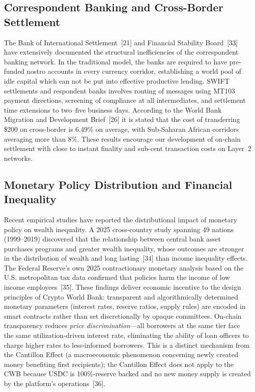 \documentclass[12pt,a4paper]{report}
\begin{document}
\subsection{Correspondent Banking and Cross-Border Settlement}

The Bank of International Settlement~[21] and Financial Stability Board~[33] have extensively documented the structural inefficiencies of the correspondent banking network. In the traditional model, the banks are required to have pre-funded nostro accounts in every currency corridor, establishing a world pool of idle capital which can not be put into effective productive lending. SWIFT settlements and respondent banks involves routing of messages using MT103 payment directions, screening of compliance at all intermediates, and settlement time extensions to two--five business days. According to the World Bank Migration and Development Brief~[26] it is stated that the cost of transferring \$200 on cross-border is 6.49\% on average, with Sub-Saharan African corridors averaging more than 8\%. These results encourage our development of on-chain settlement with close to instant finality and sub-cent transaction costs on Layer~2 networks.

\subsection{Monetary Policy Distribution and Financial Inequality}

Recent empirical studies have reported the distributional impact of monetary policy on wealth inequality. A 2025 cross-country study spanning 49 nations (1999--2019) discovered that the relationship between central bank asset purchases programs and greater wealth inequality, whose outcomes are stronger in the distribution of wealth and long lasting~[34] than income inequality effects. The Federal Reserve's own 2025 contractionary monetary analysis based on the U.S. metropolitan tax data confirmed that policies harm the income of low income employees~[35]. These findings deliver economic incentive to the design principles of Crypto World Bank: transparent and algorithmically determined monetary parameters (interest rates, reserve ratios, supply rules) are encoded in smart contracts rather than set discretionally by opaque committees. On-chain transparency reduces \textit{price discrimination}---all borrowers at the same tier face the same utilization-driven interest rate, eliminating the ability of loan officers to charge higher rates to less-informed borrowers. This is a distinct mechanism from the Cantillon Effect (a macroeconomic phenomenon concerning newly created money benefiting first recipients); the Cantillon Effect does not apply to the CWB because USDC is 100\%-reserve backed and no new money supply is created by the platform's operations~[36].
\end{document}
